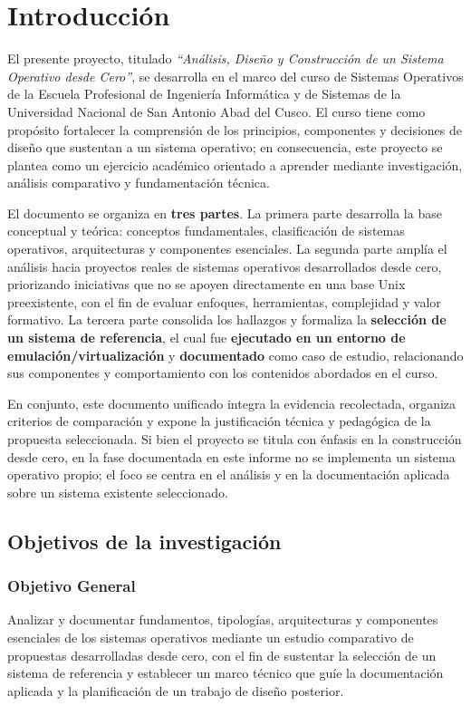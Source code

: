 \chapter{Introducción}

El presente proyecto, titulado \textit{“Análisis, Diseño y Construcción de un Sistema Operativo desde Cero”}, se desarrolla en el marco del curso de Sistemas Operativos de la Escuela Profesional de Ingeniería Informática y de Sistemas de la Universidad Nacional de San Antonio Abad del Cusco. El curso tiene como propósito fortalecer la comprensión de los principios, componentes y decisiones de diseño que sustentan a un sistema operativo; en consecuencia, este proyecto se plantea como un ejercicio académico orientado a aprender mediante investigación, análisis comparativo y fundamentación técnica.

El documento se organiza en \textbf{tres partes}. La primera parte desarrolla la base conceptual y teórica: conceptos fundamentales, clasificación de sistemas operativos, arquitecturas y componentes esenciales. La segunda parte amplía el análisis hacia proyectos reales de sistemas operativos desarrollados desde cero, priorizando iniciativas que no se apoyen directamente en una base Unix preexistente, con el fin de evaluar enfoques, herramientas, complejidad y valor formativo. La tercera parte consolida los hallazgos y formaliza la \textbf{selección de un sistema de referencia}, el cual fue \textbf{ejecutado en un entorno de emulación/virtualización} y \textbf{documentado} como caso de estudio, relacionando sus componentes y comportamiento con los contenidos abordados en el curso.

En conjunto, este documento unificado integra la evidencia recolectada, organiza criterios de comparación y expone la justificación técnica y pedagógica de la propuesta seleccionada. Si bien el proyecto se titula con énfasis en la construcción desde cero, en la fase documentada en este informe no se implementa un sistema operativo propio; el foco se centra en el análisis y en la documentación aplicada sobre un sistema existente seleccionado.

\section{Objetivos de la investigación}

\subsection{Objetivo General}
Analizar y documentar fundamentos, tipologías, arquitecturas y componentes esenciales de los sistemas operativos mediante un estudio comparativo de propuestas desarrolladas desde cero, con el fin de sustentar la selección de un sistema de referencia y establecer un marco técnico que guíe la documentación aplicada y la planificación de un trabajo de diseño posterior.

